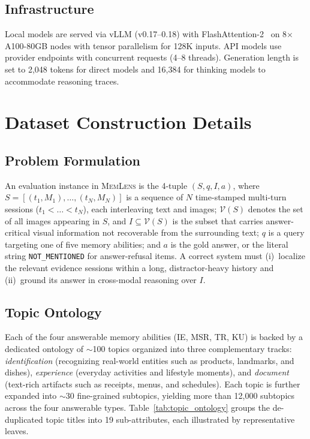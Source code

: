 \documentclass{article}
\newcommand{\bench}{\textsc{MemLens}}
\begin{document}
\subsection{Infrastructure}
\label{subsec:infra}

Local models are served via vLLM (v0.17--0.18) with FlashAttention-2~\cite{dao2023flashattention2} on 8$\times$A100-80GB nodes with tensor parallelism for 128K inputs.
API models use provider endpoints with concurrent requests (4--8 threads).
Generation length is set to 2,048 tokens for direct models and 16,384 for thinking models to accommodate reasoning traces.



\section{Dataset Construction Details}
\label{app:dataset_construction}

\subsection{Problem Formulation}
\label{app:problem_formulation}

An evaluation instance in \bench{} is the 4-tuple $(S, q, I, a)$, where $S = [(t_1, M_1), \dots, (t_N, M_N)]$ is a sequence of $N$ time-stamped multi-turn sessions ($t_1 < \dots < t_N$), each interleaving text and images; $\mathcal{V}(S)$ denotes the set of all images appearing in $S$, and $I \subseteq \mathcal{V}(S)$ is the subset that carries answer-critical visual information not recoverable from the surrounding text; $q$ is a query targeting one of five memory abilities; and $a$ is the gold answer, or the literal string \texttt{NOT\_MENTIONED} for answer-refusal items. A correct system must (i)~localize the relevant evidence sessions within a long, distractor-heavy history and (ii)~ground its answer in cross-modal reasoning over $I$.

\subsection{Topic Ontology}
\label{app:topic_ontology}

Each of the four answerable memory abilities (IE, MSR, TR, KU) is backed by a dedicated ontology of $\sim$100 topics organized into three complementary tracks: \emph{identification} (recognizing real-world entities such as products, landmarks, and dishes), \emph{experience} (everyday activities and lifestyle moments), and \emph{document} (text-rich artifacts such as receipts, menus, and schedules). Each topic is further expanded into $\sim$30 fine-grained subtopics, yielding more than 12{,}000 subtopics across the four answerable types. Table~\ref{tab:topic_ontology} groups the de-duplicated topic titles into 19 sub-attributes, each illustrated by representative leaves.
\end{document}
